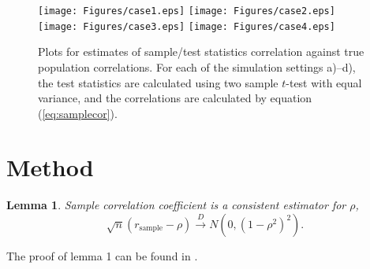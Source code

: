 \documentclass[12pt, a4paper]{article}
\newtheorem{lemma}{Lemma}
\begin{document}
	\begin{figure}[!ht]
		\centering
		\texttt{[image: Figures/case1.eps]}
		\texttt{[image: Figures/case2.eps]}
		\texttt{[image: Figures/case3.eps]}
		\texttt{[image: Figures/case4.eps]}
	\caption{Plots for estimates of sample/test statistics correlation against true population correlations. For each of the simulation settings a)--d), the test statistics are calculated using two sample $t$-test with equal variance, and the correlations are calculated by equation (\ref{eq:samplecor}). }
		\label{fig:tstat}
	\end{figure}

	
	
	
	
	
	\section{Method}\label{section:testcormethod}
	
	\begin{lemma}
		Sample correlation coefficient is a consistent estimator for $\rho$, 
		\[\sqrt{n}(r_{\text{sample}} - \rho ) \stackrel{D}{\rightarrow}N\left(0, (1-\rho^2)^2\right).\]
	\end{lemma}
	The proof of lemma 1 can be found in \citet{fisher1915frequency}. \\
	
\end{document}
